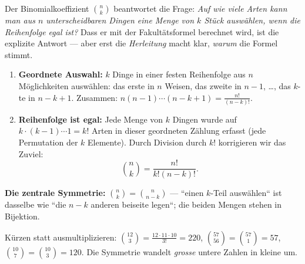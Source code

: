 


Der Binomialkoeffizient $\binom{n}{k}$ beantwortet die Frage: \emph{Auf
wie viele Arten kann man aus $n$ unterscheidbaren Dingen eine Menge von
$k$ Stück auswählen, wenn die Reihenfolge egal ist?} Dass er mit der
Fakultätsformel berechnet wird, ist die explizite Antwort --- aber erst
die \emph{Herleitung} macht klar, \emph{warum} die Formel stimmt.

\begin{werkzeugkasten}[Warum $\binom{n}{k}=\frac{n!}{k!(n-k)!}$? --- die Herleitung]
\begin{enumerate}
  \item \textbf{Geordnete Auswahl:} $k$ Dinge in einer festen Reihenfolge
        aus $n$ Möglichkeiten auswählen: das erste in $n$ Weisen, das
        zweite in $n-1$, \dots, das $k$-te in $n-k+1$. Zusammen:
        $n(n-1)\cdots(n-k+1)=\frac{n!}{(n-k)!}$.
  \item \textbf{Reihenfolge ist egal:} Jede Menge von $k$ Dingen wurde
        auf $k\cdot(k-1)\cdots1=k!$ Arten in dieser geordneten Zählung
        erfasst (jede Permutation der $k$ Elemente). Durch Division durch
        $k!$ korrigieren wir das Zuviel:
        \begin{equation}
          \binom{n}{k}=\frac{n!}{k!(n-k)!}.
        \end{equation}
\end{enumerate}
\textbf{Die zentrale Symmetrie:} $\binom{n}{k}=\binom{n}{n-k}$ --- ``einen
$k$-Teil auswählen`` ist dasselbe wie ``die $n-k$ anderen beiseite
legen``; die beiden Mengen stehen in Bijektion.
\end{werkzeugkasten}

\begin{werkzeugkasten}
Kürzen statt ausmultiplizieren:
$\binom{12}{3}=\frac{12\cdot11\cdot10}{3!}=220$,
$\binom{57}{56}=\binom{57}{1}=57$,
$\binom{10}{7}=\binom{10}{3}=120$. Die Symmetrie wandelt \emph{grosse}
untere Zahlen in kleine um.
\end{werkzeugkasten}

